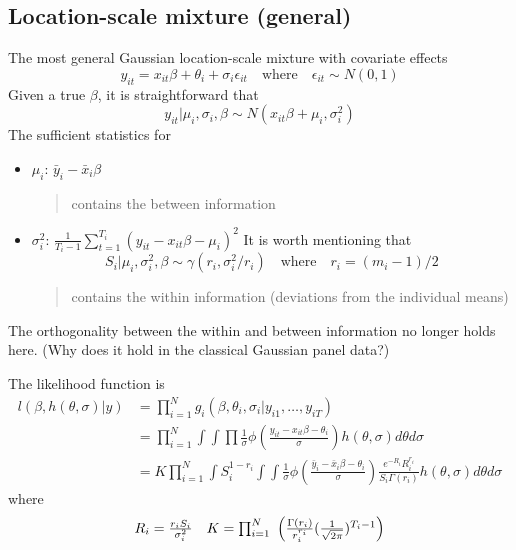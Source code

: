 \subsection{Location-scale mixture (general)}
The most general Gaussian location-scale mixture with covariate effects
\begin{equation*}
    y_{it}=x_{it}\beta+\theta_i+\sigma_i\epsilon_{it} \quad \text{where} \quad \epsilon_{it}\sim N(0,1)
\end{equation*}
Given a true $\beta$, it is straightforward that \begin{equation*}
    y_{it}|\mu_i,\sigma_i,\beta \sim N(x_{it}\beta+\mu_i,\sigma_i^2)
\end{equation*}
The sufficient statistics for
\begin{itemize}
    \item $\mu_i$: $\bar{y}_i-\bar{x}_i\beta$
          \begin{quote}
              contains the between information
          \end{quote}
    \item $\sigma_i^2$: $\frac{1}{T_i-1}\sum_{t=1}^{T_i}(y_{it}-x_{it}\beta-\mu_i)^2$
          It is worth mentioning that \begin{equation*}
              S_i|\mu_i,\sigma_i^2,\beta \sim \gamma(r_i,\sigma_i^2/r_i) \quad \text{where} \quad r_i=(m_i-1)/2
          \end{equation*}
          \begin{quote}
              contains the within information (deviations from the individual means)
          \end{quote}
\end{itemize}
\begin{remark}
    The orthogonality between the within and between information no longer holds here. (Why does it hold in the classical Gaussian panel data?)
\end{remark}
The likelihood function is \begin{equation*}
    \begin{split}
        l(\beta, h(\theta,\sigma)|y)&=\prod_{i=1}^N g_i(\beta,\theta_i,\sigma_i|y_{i1},\ldots,y_{iT})\\
        &=\prod_{i=1}^N\int \int \prod \frac{1}{\sigma} \phi(\frac{y_{it}-x_{it}\beta-\theta_i}{\sigma}) h(\theta,\sigma)d\theta d\sigma\\
        & =K \prod_{i=1}^N\int S_i^{1-r_i}\int\int \frac{1}{\sigma} \phi(\frac{\bar{y}_{i}-\bar{x}_{i}\beta-\theta_i}{\sigma})\frac{e^{-R_i}R_i^{r_i}}{S_i\Gamma(r_i)}h(\theta, \sigma)d\theta d\sigma
    \end{split}
\end{equation*}
where \begin{equation*}
    \begin{array}{ll}
        R_i=\frac{r_iS_i}{\sigma_i^2} & K=\prod_{i=1}^N\ \pa{\frac{\Gamma(r_i)}{r_i^{r_i}}(\frac{1}{\sqrt{2\pi}})^{T_i-1}}
    \end{array}
\end{equation*}

